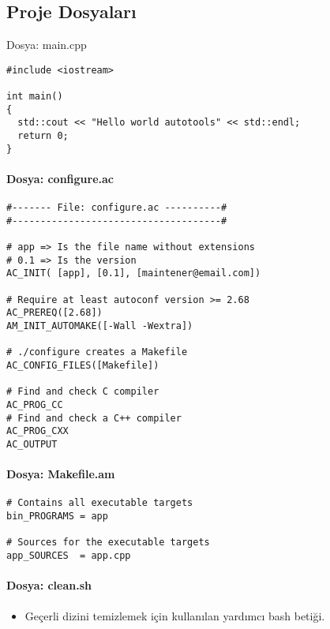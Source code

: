 \documentclass[
]{book}
\providecommand{\tightlist}{%
  \setlength{\itemsep}{0pt}\setlength{\parskip}{0pt}}
\begin{document}
\hypertarget{proje-dosyalarux131}{%
\subsection{Proje Dosyaları}\label{proje-dosyalarux131}}

Dosya: main.cpp

\begin{verbatim}
#include <iostream>

int main()
{
  std::cout << "Hello world autotools" << std::endl;
  return 0;
}
\end{verbatim}

\hypertarget{dosya-configure.ac}{%
\paragraph{Dosya: configure.ac}\label{dosya-configure.ac}}

\begin{verbatim}
#------- File: configure.ac ----------#
#-------------------------------------# 

# app => Is the file name without extensions
# 0.1 => Is the version 
AC_INIT( [app], [0.1], [maintener@email.com])

# Require at least autoconf version >= 2.68 
AC_PREREQ([2.68])  
AM_INIT_AUTOMAKE([-Wall -Wextra])

# ./configure creates a Makefile
AC_CONFIG_FILES([Makefile])

# Find and check C compiler 
AC_PROG_CC
# Find and check a C++ compiler 
AC_PROG_CXX 
AC_OUTPUT 
\end{verbatim}

\hypertarget{dosya-makefile.am}{%
\paragraph{Dosya: Makefile.am}\label{dosya-makefile.am}}

\begin{verbatim}
# Contains all executable targets 
bin_PROGRAMS = app

# Sources for the executable targets 
app_SOURCES  = app.cpp 
\end{verbatim}

\hypertarget{dosya-clean.sh}{%
\paragraph{Dosya: clean.sh}\label{dosya-clean.sh}}

\begin{itemize}
\tightlist
\item
  Geçerli dizini temizlemek için kullanılan yardımcı bash betiği.
\end{itemize}
\end{document}

